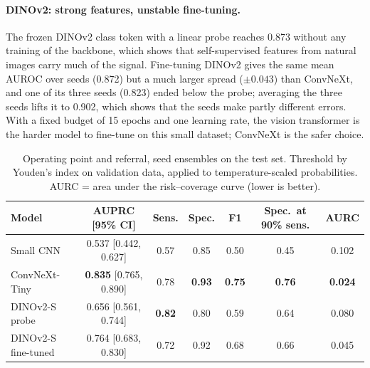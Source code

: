 \documentclass[11pt,a4paper]{article}
\begin{document}
\paragraph{DINOv2: strong features, unstable fine-tuning.} The frozen DINOv2 class token with a linear probe reaches
0.873 without any training of the backbone, which shows that self-supervised features from natural images carry much
of the signal. Fine-tuning DINOv2 gives the same mean AUROC over seeds (0.872) but a much larger spread ($\pm 0.043$)
than ConvNeXt, and one of its three seeds (0.823) ended below the probe; averaging the three seeds lifts it to
0.902, which shows that the seeds make partly different errors. With a fixed budget of 15 epochs and one learning
rate, the vision transformer is the harder model to fine-tune on this small dataset; ConvNeXt is the safer choice.

\begin{table}[t]
\centering
\caption{Operating point and referral, seed ensembles on the test set. Threshold by Youden's index on validation
data, applied to temperature-scaled probabilities. AURC = area under the risk--coverage curve (lower is better).}
\label{tab:op}
\small
\begin{tabular}{lcccccc}
\toprule
Model & AUPRC [95\% CI] & Sens. & Spec. & F1 & Spec.\ at 90\% sens. & AURC \\
\midrule
Small CNN          & 0.537 [0.442, 0.627] & 0.57 & 0.85 & 0.50 & 0.45 & 0.102 \\
ConvNeXt-Tiny      & \textbf{0.835} [0.765, 0.890] & 0.78 & \textbf{0.93} & \textbf{0.75} & \textbf{0.76} & \textbf{0.024} \\
DINOv2-S probe     & 0.656 [0.561, 0.744] & \textbf{0.82} & 0.80 & 0.59 & 0.64 & 0.080 \\
DINOv2-S fine-tuned & 0.764 [0.683, 0.830] & 0.72 & 0.92 & 0.68 & 0.66 & 0.045 \\
\bottomrule
\end{tabular}
\end{table}
\end{document}
